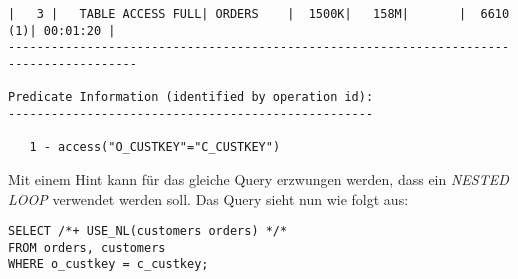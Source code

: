 \documentclass[11pt,a4paper,parskip=half]{scrartcl}
\begin{document}
\begin{lstlisting}
|   3 |   TABLE ACCESS FULL| ORDERS    |  1500K|   158M|       |  6610   (1)| 00:01:20 |                                                                                                                                                                                                                     
----------------------------------------------------------------------------------------                                                                                                                                                                                                                     
                                                                                                                                                                                                                                                                                                             
Predicate Information (identified by operation id):                                                                                                                                                                                                                                                          
---------------------------------------------------                                                                                                                                                                                                                                                          
                                                                                                                                                                                                                                                                                                             
   1 - access("O_CUSTKEY"="C_CUSTKEY")                                                                                                                                                                                                                                                                       
\end{lstlisting}

Mit einem Hint kann für das gleiche Query erzwungen werden, dass ein \emph{NESTED LOOP} verwendet werden soll. Das Query sieht nun wie folgt aus:
\begin{lstlisting}
SELECT /*+ USE_NL(customers orders) */*
FROM orders, customers
WHERE o_custkey = c_custkey;
\end{lstlisting}
\end{document}
